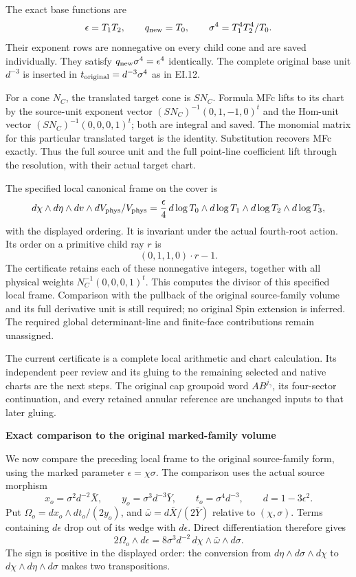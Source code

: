 The exact base functions are
\[
 \epsilon=T_1T_2,\qquad q_{\rm new}=T_0,\qquad
 \sigma^4=T_1^4T_2^4/T_0.
\]
Their exponent rows are nonnegative on every child cone and are saved individually. They satisfy
\(q_{\rm new}\sigma^4=\epsilon^4\) identically. The complete original base unit \(d^{-3}\) is inserted in \(t_{\rm original}=d^{-3}\sigma^4\) as in EI.12.

For a cone \(N_C\), the translated target cone is \(SN_C\).
Formula MFc lifts to its chart by the source-unit exponent vector
\((SN_C)^{-1}(0,1,-1,0)^t\) and the Hom-unit vector
\((SN_C)^{-1}(0,0,0,1)^t\); both are integral and saved.
The monomial matrix for this particular translated target is the identity. Substitution recovers MFc exactly. Thus the full source unit and the full point-line coefficient lift through the resolution, with their actual target chart.

The specified local canonical frame on the cover is
\[
 d\chi\wedge d\eta\wedge dv\wedge dV_{\rm phys}/V_{\rm phys}
 =\frac{\epsilon}{4}\,
   d\log T_0\wedge d\log T_1\wedge d\log T_2\wedge d\log T_3,
\]
with the displayed ordering. It is invariant under the actual fourth-root action. Its order on a primitive child ray \(r\) is
\[
 (0,1,1,0)\cdot r-1 .
\]
The certificate retains each of these nonnegative integers, together with all physical weights \(N_C^{-1}(0,0,0,1)^t\). This computes the divisor of this specified local frame. Comparison with the pullback of the original source-family volume and its full derivative unit is still required; no original Spin extension is inferred. The required global determinant-line and finite-face contributions remain unassigned.

The current certificate is a complete local arithmetic and chart calculation. Its independent peer review and its gluing to the remaining selected and native charts are the next steps. The original cap groupoid word \(AB^{j_\gamma}\), its four-sector continuation, and every retained annular reference are unchanged inputs to that later gluing.

\par

\medskip\noindent\textbf{Exact comparison to the original marked-family volume}

\par\nobreak

We now compare the preceding local frame to the original source-family form, using the marked parameter \(\epsilon=\chi\sigma\). The comparison uses the actual source morphism
\[
 x_o=\sigma^2d^{-2}\bar X,\qquad
 y_o=\sigma^3d^{-3}\bar Y,\qquad
 t_o=\sigma^4d^{-3},\qquad d=1-3\epsilon^2.
\]
Put \(\Omega_o=dx_o\wedge dt_o/(2y_o)\), and
\(\bar\omega=d\bar X/(2\bar Y)\) relative to \((\chi,\sigma)\).
Terms containing \(d\epsilon\) drop out of its wedge with \(d\epsilon\).
Direct differentiation therefore gives
\[
 2\Omega_o\wedge d\epsilon
 =8\sigma^3d^{-2}\,
       d\chi\wedge\bar\omega\wedge d\sigma.                    \tag{MFe}
\]
The sign is positive in the displayed order: the conversion from
\(d\eta\wedge d\sigma\wedge d\chi\) to
\(d\chi\wedge d\eta\wedge d\sigma\) makes two transpositions.

